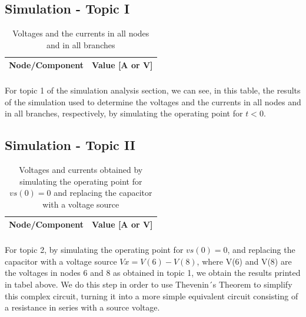 \subsection{Simulation - Topic I}
\label{subsec:sim_first}

\begin{table}[H] \centering
  \begin{tabular}{|l|r|}
    \hline    
    {\bf Node/Component} & {\bf Value [A or V]} \\ \hline
    
  \end{tabular}
  \caption*{Voltages and the currents in all nodes and in all branches}
 \label{tab:op1}
\end{table}

\paragraph{}
For topic 1 of the simulation analysis section, we can see, in this table, the results of the simulation used to determine the voltages and the currents in all nodes and in all branches, respectively, by simulating the operating point for $t<0$.

\subsection{Simulation - Topic II}
\label{subsec:sim_second}

\begin{table}[H] \centering
  \begin{tabular}{|l|r|}
    \hline    
    {\bf Node/Component} & {\bf Value [A or V]} \\ \hline
    
  \end{tabular}
  \caption*{Voltages and currents obtained by simulating the operating point for $vs(0)=0$ and replacing the capacitor with a voltage source}
 \label{tab:op1}
\end{table}

\paragraph{}
For topic 2, by simulating the operating point for $vs(0)=0$, and replacing the capacitor with a voltage source $Vx = V(6)-V(8)$, where V(6) and V(8) are the voltages in nodes 6 and 8 as obtained in topic 1, we obtain the results printed in tabel above. We do this step in order to use Thevenin´s Theorem to simplify this complex circuit, turning it into a more simple equivalent circuit consisting of a resistance in series with a source voltage.

